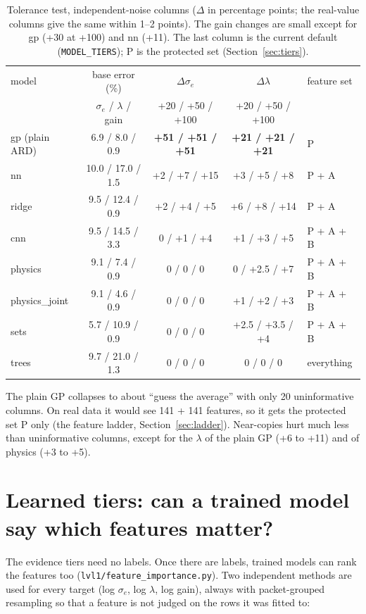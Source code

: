 \documentclass[10pt]{article}
\newcommand{\code}[1]{\texttt{#1}}
\newcommand{\se}{\sigma_e}
\begin{document}
\begin{table}[H]
\centering\small
\begin{tabular}{lcccl}
\toprule
model & base error (\%) & $\Delta\se$ & $\Delta\lambda$ & feature set \\
 & $\se$ / $\lambda$ / gain & +20 / +50 / +100 & +20 / +50 / +100 & \\
\midrule
gp (plain ARD) & 6.9 / 8.0 / 0.9 & \textbf{+51 / +51 / +51} & \textbf{+21 / +21 / +21} & P \\
nn & 10.0 / 17.0 / 1.5 & +2 / +7 / +15 & +3 / +5 / +8 & P + A \\
ridge & 9.5 / 12.4 / 0.9 & +2 / +4 / +5 & +6 / +8 / +14 & P + A \\
cnn & 9.5 / 14.5 / 3.3 & 0 / +1 / +4 & +1 / +3 / +5 & P + A + B \\
physics & 9.1 / 7.4 / 0.9 & 0 / 0 / 0 & 0 / +2.5 / +7 & P + A + B \\
physics\_joint & 9.1 / 4.6 / 0.9 & 0 / 0 / 0 & +1 / +2 / +3 & P + A + B \\
sets & 5.7 / 10.9 / 0.9 & 0 / 0 / 0 & +2.5 / +3.5 / +4 & P + A + B \\
trees & 9.7 / 21.0 / 1.3 & 0 / 0 / 0 & 0 / 0 / 0 & everything \\
\bottomrule
\end{tabular}
\caption{Tolerance test, independent-noise columns ($\Delta$ in percentage points; the real-value columns give the same
within 1--2 points). The gain changes are small except for gp (+30 at +100) and nn (+11). The last column is the
current default (\code{MODEL\_TIERS}); P is the protected set (Section~\ref{sec:tiers}).}
\end{table}

The plain GP collapses to about ``guess the average'' with only 20 uninformative columns. On real data it would see
141 + 141 features, so it gets the protected set P only (the feature ladder, Section~\ref{sec:ladder}). Near-copies hurt much less than uninformative columns, except for the
$\lambda$ of the plain GP (+6 to +11) and of physics (+3 to +5).

\section{Learned tiers: can a trained model say which features matter?}
\label{sec:learned}

The evidence tiers need no labels. Once there are labels, trained models can rank the features too
(\code{lvl1/feature\_importance.py}). Two independent methods are used for every target (log $\se$, log $\lambda$,
log gain), always with packet-grouped resampling so that a feature is not judged on the rows it was fitted to:
\end{document}
